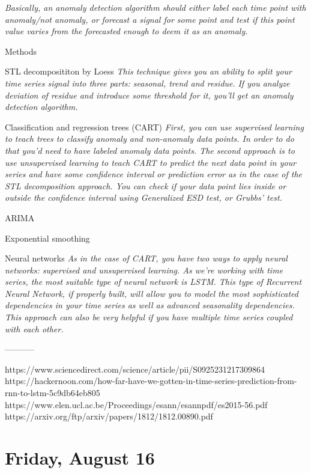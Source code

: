 \documentclass[11pt,letterpaper]{article}
\begin{document}
\textit{Basically, an anomaly detection algorithm should either label each time point with anomaly/not anomaly, or forecast a signal for some point and test if this point value varies from the forecasted enough to deem it as an anomaly.}

Methods

STL decomposititon by Loess
\textit{This technique gives you an ability to split your time series signal into three parts: seasonal, trend and residue.}
\textit{If you analyze deviation of residue and introduce some threshold for it, you’ll get an anomaly detection algorithm.}

Classification and regression trees (CART)
\textit{First, you can use supervised learning to teach trees to classify anomaly and non-anomaly data points. In order to do that you’d need to have labeled anomaly data points.
The second approach is to use unsupervised learning to teach CART to predict the next data point in your series and have some confidence interval or prediction error as in the case of the STL decomposition approach. You can check if your data point lies inside or outside the confidence interval using Generalized ESD test, or Grubbs’ test.}

ARIMA

Exponential smoothing

Neural networks
\textit{As in the case of CART, you have two ways to apply neural networks: supervised and unsupervised learning.
As we’re working with time series, the most suitable type of neural network is LSTM. This type of Recurrent Neural Network, if properly built, will allow you to model the most sophisticated dependencies in your time series as well as advanced seasonality dependencies.
This approach can also be very helpful if you have multiple time series coupled with each other.}

-----------

https://www.sciencedirect.com/science/article/pii/S0925231217309864
https://hackernoon.com/how-far-have-we-gotten-in-time-series-prediction-from-rnn-to-lstm-5c9db64eb805
https://www.elen.ucl.ac.be/Proceedings/esann/esannpdf/es2015-56.pdf
https://arxiv.org/ftp/arxiv/papers/1812/1812.00890.pdf

\section*{Friday, August 16}

\printbibliography 
\end{document}
